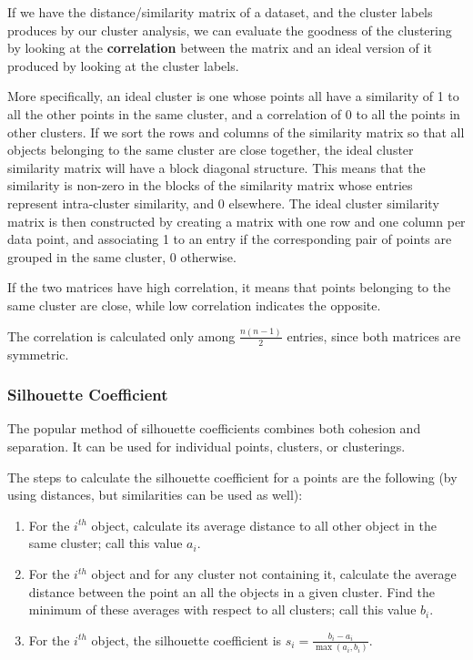 If we have the distance/similarity matrix of a dataset, and the cluster labels produces by our cluster analysis, we can evaluate the goodness of the clustering by looking at the \textbf{correlation} between the matrix and an ideal version of it produced by looking at the cluster labels.

More specifically, an ideal cluster is one whose points all have a similarity of 1 to all the other points in the same cluster, and a correlation of 0 to all the points in other clusters. If we sort the rows and columns of the similarity matrix so that all objects belonging to the same cluster are close together, the ideal cluster similarity matrix will have a block diagonal structure. This means that the similarity is non-zero in the blocks of the similarity matrix whose entries represent intra-cluster similarity, and 0 elsewhere. The ideal cluster similarity matrix is then constructed by creating a matrix with one row and one column per data point, and associating 1 to an entry if the corresponding pair of points are grouped in the same cluster, 0 otherwise.

If the two matrices have high correlation, it means that points belonging to the same cluster are close, while low correlation indicates the opposite.

The correlation is calculated only among $\frac{n(n-1)}{2}$ entries, since both matrices are symmetric.

\subsubsection{Silhouette Coefficient}

The popular method of silhouette coefficients combines both cohesion and separation. It can be used for individual points, clusters, or clusterings.

The steps to calculate the silhouette coefficient for a points are the following (by using distances, but similarities can be used as well):

\begin{enumerate}
    \item For the $i^{th}$ object, calculate its average distance to all other object in the same cluster; call this value $a_i$.

    \item For the $i^{th}$ object and for any cluster not containing it, calculate the average distance between the point an all the objects in a given cluster. Find the minimum of these averages with respect to all clusters; call this value $b_i$.

    \item For the $i^{th}$ object, the silhouette coefficient is $s_i = \frac{b_i - a_i}{\max(a_i,b_i)}$.
\end{enumerate}

